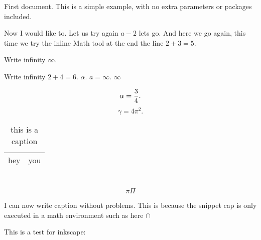 \documentclass{article}
\begin{document}
First document. This is a simple example, with no 
extra parameters or packages included.

Now I would like to.
Let us try again $a-2$ lets go. And here we go again, this time we try the inline Math tool at the end
the line $2+3=5$.

Write infinity $\infty$.

Write infinity $2+4=6$.
$\alpha$. $a = \infty$. $ \infty $ 

\[
\alpha = \frac{3}{4}\\
.\] 
\[
\gamma = 4\pi ^{2} 
.\] 

\begin{table}[h]
    \centering
    \begin{tabular}{c|c}
            hey &  you \\
             &   \\
             &   \\
             &   \\
             &   \\
    \end{tabular}
    \caption{this is a caption}
    \label{tab:first}
\end{table}

\[
    \pi \Pi 
\]

I can now write caption without problems. This is because the snippet cap is only executed in
a math environment such as here \(\cap \) 

This is a test for inkscape:
\end{document}
